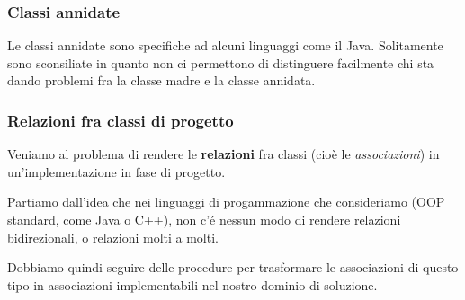 \documentclass[a4paper,11pt]{article}
\begin{document}
\subsubsection{Classi annidate}
Le classi annidate sono specifiche ad alcuni linguaggi come il Java. Solitamente sono sconsiliate in quanto non ci permettono di distinguere facilmente chi sta dando problemi fra la classe madre e la classe annidata. 

\subsubsection{Relazioni fra classi di progetto}
Veniamo al problema di rendere le \textbf{relazioni} fra classi (cioè le \textit{associazioni}) in un'implementazione in fase di progetto.

Partiamo dall'idea che nei linguaggi di progammazione che consideriamo (OOP standard, come Java o C++), non c'é nessun modo di rendere relazioni bidirezionali, o relazioni molti a molti.

Dobbiamo quindi seguire delle procedure per trasformare le associazioni di questo tipo in associazioni implementabili nel nostro dominio di soluzione.
\end{document}
